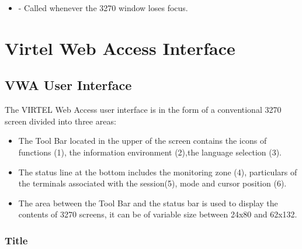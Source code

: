 \documentclass[letterpaper,10pt,english]{sphinxmanual}
\begin{document}
\ignorespaces \begin{itemize}
\item {} 
 - Called whenever the 3270 window loses focus.

\end{itemize}


\chapter{Virtel Web Access Interface}
\label{\detokenize{Customization:virtel-web-access-interface}}
\ignorespaces 

\section{VWA User Interface}
\label{\detokenize{Customization:vwa-user-interface}}\label{\detokenize{Customization:index-15}}
The VIRTEL Web Access user interface is in the form of a conventional 3270 screen divided into three areas:
\begin{itemize}
\item {} 
The Tool Bar located in the upper of the screen contains the icons of functions (1), the information environment (2),the language selection (3).

\item {} 
The status line at the bottom includes the monitoring zone (4), particulars of the terminals associated with the session(5), mode and cursor position (6).

\item {} 
The area between the Tool Bar and the status bar is used to display the contents of 3270 screens, it can be of variable size between 24x80 and 62x132.

\end{itemize}



\subsection{Title}
\label{\detokenize{Customization:title}}
\ignorespaces 
\end{document}
